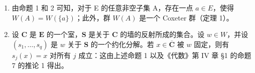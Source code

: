 \begin{enumerate}
\def\labelenumi{\arabic{enumi})}
\setcounter{enumi}{1}
\item
由命题 1 和 2 可知，对于 E 的任意非空子集 A，存在一点 \(a \in E\)，使得 \(W(A) = W(\{a\})\)；此外，群 \(W(A)\) 是一个 Coxeter 群（定理 1）。
\item
设 \(\mathbf{C}\) 是 \(\mathbf{E}\) 的一个室，\(\mathbf{S}\) 是关于 \(\mathbf{C}\) 的墙的反射所成的集合。设 \(w \in W\)，并设 \((s_1, \ldots, s_q)\) 是 \(w\) 关于 \(\mathbf{S}\) 的一个约化分解。若 \(x \in \overline{\mathbf{C}}\) 被 \(w\) 固定，则有 \(s_j(x) = x\) 对所有 \(j\) 成立：这由上述命题 1 以及《代数》第 IV 章 §1 的命题 7 的推论 1 得出。
\end{enumerate}

